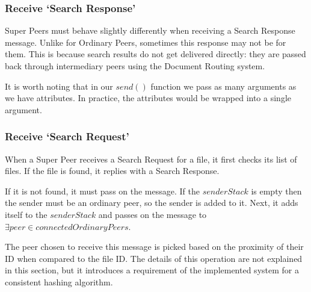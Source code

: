 \subsubsection{Receive `Search Response'}

Super Peers must behave slightly differently when receiving a Search Response
message. Unlike for Ordinary Peers, sometimes this response may not be for them.
This is because search results do not get delivered directly: they are passed
back through intermediary peers using the Document Routing system.

It is worth noting that in our $send()$ function we pass as many arguments as we
have attributes. In practice, the attributes would be wrapped into a single
argument.

\begin{algorithm}[H]

\end{algorithm}

\subsubsection{Receive `Search Request'}


When a Super Peer receives a Search Request for a file, it first checks its list
of files. If the file is found, it replies with a Search Response. 

If it is not found, it must pass on the message. If the $senderStack$ is empty
then the sender must be an ordinary peer, so the sender is added to it.  Next,
it adds itself to the $senderStack$ and passes on the message to $\exists peer
\in connectedOrdinaryPeers$.

The peer chosen to receive this message is picked based on the proximity of
their ID when compared to the file ID.  The details of this operation are not
explained in this section, but it introduces a requirement of the implemented
system for a consistent hashing algorithm.

